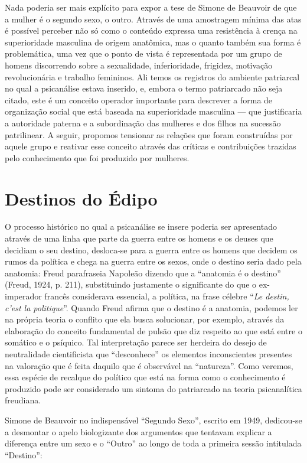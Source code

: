 Nada poderia ser mais explícito para expor a tese de Simone de Beauvoir
de que a mulher é o segundo sexo, o outro. Através de uma amostragem
mínima das atas é possível perceber não só como o conteúdo expressa uma
resistência à crença na superioridade masculina de origem anatômica, mas
o quanto também sua forma é problemática, uma vez que o ponto de vista é
representada por um grupo de homens discorrendo sobre a sexualidade,
inferioridade, frigidez, motivação revolucionária e trabalho femininos.
Ali temos os registros do ambiente patriarcal no qual a psicanálise
estava inserido, e, embora o termo patriarcado não seja citado, este é
um conceito operador importante para descrever a forma de organização
social que está baseada na superioridade masculina --- que justificaria a
autoridade paterna e a subordinação das mulheres e dos filhos na
sucessão patrilinear. A seguir, propomos tensionar as relações que foram
construídas por aquele grupo e reativar esse conceito através das
críticas e contribuições trazidas pelo conhecimento que foi produzido
por mulheres.

\section{Destinos do Édipo}

O processo histórico no qual a psicanálise se insere poderia ser
apresentado através de uma linha que parte da guerra entre os homens e
os deuses que decidiam o seu destino, desloca-se para a guerra entre os
homens que decidem os rumos da política e chega na guerra entre os
sexos, onde o destino seria dado pela anatomia: Freud parafraseia
Napoleão dizendo que a ``anatomia é o destino'' (Freud, 1924, p. 211),
substituindo justamente o significante do que o ex-imperador francês
considerava essencial, a política, na frase célebre ``\emph{Le destin,
c'est la politique}''. Quando Freud afirma que o destino é a anatomia,
podemos ler na própria teoria o conflito que ela busca solucionar, por
exemplo, através da elaboração do conceito fundamental de pulsão que diz
respeito ao que está entre o somático e o psíquico. Tal interpretação
parece ser herdeira do desejo de neutralidade cientificista que
``desconhece'' os elementos inconscientes presentes na valoração que é
feita daquilo que é observável na ``natureza''. Como veremos, essa
espécie de recalque do político que está na forma como o conhecimento é
produzido pode ser considerado um sintoma do patriarcado na teoria
psicanalítica freudiana.

Simone de Beauvoir no indispensável ``Segundo Sexo'', escrito em 1949,
dedicou-se a desmontar o apelo biologizante dos argumentos que tentavam
explicar a diferença entre um sexo e o ``Outro'' ao longo de toda a
primeira sessão intitulada ``Destino'':

